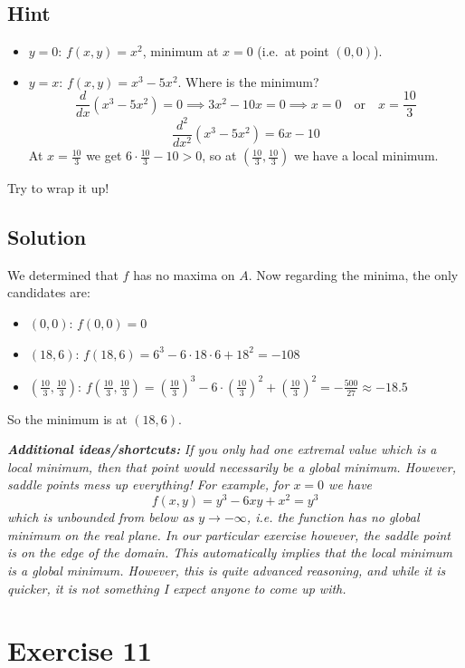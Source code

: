 \documentclass[a4paper,10pt]{article}
\begin{document}
\subsection{Hint}
\begin{itemize}
    \item $y=0$: $f(x,y) = x^2$, minimum at $x=0$ (i.e.\ at point $(0,0)$).
    \item $y=x$: $f(x,y) = x^3 - 5x^2$. Where is the minimum?
          \[
              \frac{d}{dx}(x^3 - 5x^2) = 0 \implies 3x^2 - 10x = 0 \implies x = 0 \quad \mathrm{or} \quad x = \frac{10}{3}
          \]
          \[
              \frac{d^2}{dx^2}(x^3 - 5x^2) = 6x - 10
          \]
          At $x = \frac{10}{3}$ we get $6\cdot\frac{10}{3} - 10 > 0$, so at $\left(\frac{10}{3}, \frac{10}{3}\right)$ we have a local minimum.
\end{itemize}
Try to wrap it up!

\subsection{Solution}
We determined that $f$ has no maxima on $A$. Now regarding the minima, the only candidates are:
\begin{itemize}
    \item $(0,0)$: $f(0,0) = 0$
    \item $(18, 6)$: $f(18, 6) = 6^3 - 6\cdot 18\cdot 6 + 18^2 = - 108$
    \item $\left(\frac{10}{3}, \frac{10}{3}\right)$: $f\left(\frac{10}{3}, \frac{10}{3}\right) = \left(\frac{10}{3}\right)^3 - 6\cdot \left(\frac{10}{3}\right)^2 + \left(\frac{10}{3}\right)^2 = -\frac{500}{27} \approx -18.5$
\end{itemize}
So the minimum is at $(18, 6)$.

\textbf{\emph{Additional ideas/shortcuts:}} \emph{If you only had one extremal value which is a local minimum, then that point would necessarily be a global minimum. However, saddle points mess up everything! For example, for $x=0$ we have \[f(x,y) = y^3 - 6xy + x^2 = y^3\] which is unbounded from below as $y\to-\infty$, i.e. the function has no global minimum on the real plane. In our particular exercise however, the saddle point is on the edge of the domain. This automatically implies that the local minimum is a global minimum. However, this is quite advanced reasoning, and while it is quicker, it is not something I expect anyone to come up with.}

\clearpage

\section{Exercise 11}
\end{document}
